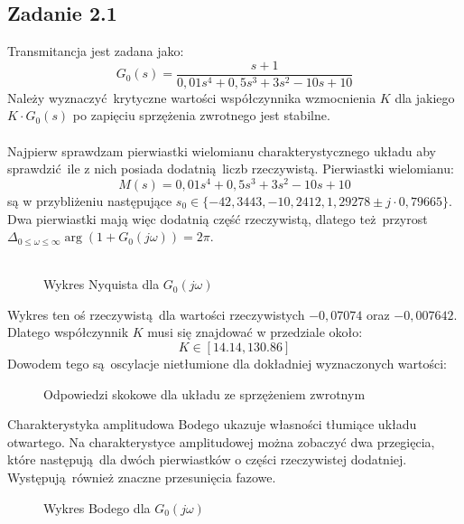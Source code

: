 \documentclass[a4paper, 12pt]{article}
\begin{document}
		\subsection{Zadanie 2.1}
		Transmitancja jest zadana jako:
		$$
			G_0(s) = \frac{s + 1}{0,01s^4 + 0,5s^3 + 3 s^2 -10s + 10}
		$$ \noindent
		Należy wyznaczyć krytyczne wartości współczynnika wzmocnienia $K$ dla jakiego $K \cdot G_0(s)$ po zapięciu sprzężenia zwrotnego jest stabilne.
		\\
		\\
		Najpierw sprawdzam pierwiastki wielomianu charakterystycznego układu aby sprawdzić ile z nich posiada dodatnią liczb rzeczywistą. Pierwiastki wielomianu: 
		$$
			M(s) = 0,01s^4 + 0,5s^3 + 3 s^2 -10s + 10
		$$
		są w przybliżeniu następujące $s_0 \in \{-42,3443, -10,2412, 1,29278 \pm j\cdot 0,79665\}$. Dwa \linebreak pierwiastki mają więc dodatnią część rzeczywistą, dlatego też przyrost \linebreak $\Delta_{0 \leq \omega \leq \infty} \arg(1 + G_0(j\omega)) = 2\pi$. \\ \\
		\begin{figure}[H]
			\centering
			\def \svgwidth{0.7\columnwidth}
			
			\caption{Wykres Nyquista dla $G_0(j\omega)$}
		\end{figure}\noindent
		Wykres ten oś rzeczywistą dla wartości rzeczywistych $-0,07074$ oraz $-0,007642$. Dlatego współczynnik $K$ musi się znajdować w przedziale około:
		$$
			K \in [14.14, 130.86]
		$$
		Dowodem tego są oscylacje nietłumione dla dokładniej wyznaczonych wartości:
		\begin{figure}[H]
			\centering
			\def \svgwidth{0.49\columnwidth}
			
			\def \svgwidth{0.49\columnwidth}
			
			\caption{Odpowiedzi skokowe dla układu ze sprzężeniem zwrotnym}
		\end{figure}\noindent
		Charakterystyka amplitudowa Bodego ukazuje własności tłumiące układu otwartego. Na charakterystyce amplitudowej można zobaczyć dwa przegięcia, które następują dla dwóch pierwiastków o części rzeczywistej dodatniej. Występują również znaczne przesunięcia fazowe.
		\begin{figure}[H]
			\centering
			\def \svgwidth{0.7\columnwidth}
			
			\caption{Wykres Bodego dla $G_0(j\omega)$}
		\end{figure}\noindent
\end{document}
